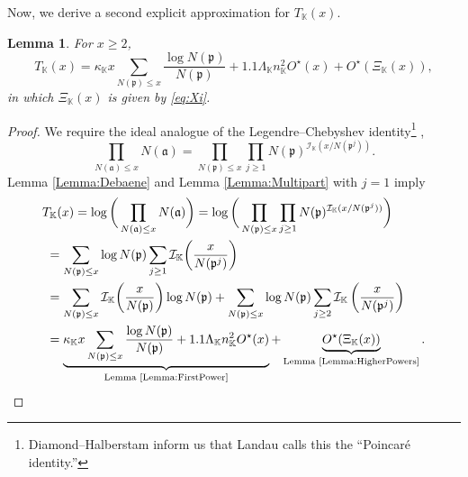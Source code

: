 \documentclass[10pt,reqno]{amsart}
\theoremstyle{plain}
\newtheorem{lemma}[theorem]{Lemma}
\theoremstyle{definition}
\newcommand{\K}{\mathbb{K}}
\newcommand{\PP}{\mathfrak{p}}
\newcommand{\I}{\mathcal{I}}
\begin{document}
Now, we derive a second explicit approximation for $T_{\K}(x)$.

\begin{lemma}\label{Lemma:SecondBound}
For $x \geq 2$,
\begin{equation*}
T_{\K}(x) = \kappa_{\K} x \sum_{N(\PP)\leq x} \frac{\log{N(\PP)}}{N(\PP)} + 1.1 \Lambda_{\K}n_{\K}^2 O^{\star} (x) + O^{\star}(\Xi_{\K}(x)),
\end{equation*}
in which $\Xi_{\K}(x)$ is given by \eqref{eq:Xi}.
\end{lemma}

\begin{proof}
We require the ideal analogue of the Legendre--Chebyshev identity\footnote{Diamond--Halberstam \cite[p.~128]{DiamondHalberstam}
inform us that Landau calls this the ``Poincar\'e identity.''} \cite{Legendre},
\begin{equation*}
\prod_{N(\mathfrak{a})\leq x}N(\mathfrak{a}) = \prod_{N(\PP)\leq x}
\prod_{j\geq 1}N(\PP)^{\I_{\K} ( x / N(\PP^j) )}.
\end{equation*}
Lemma \ref{Lemma:Debaene} and Lemma \ref{Lemma:Multipart} with $j  = 1$ imply
\begin{align*}
&T_{\K}(x)
= \log\bigg(\prod_{N(\mathfrak{a})\leq x}N(\mathfrak{a})\bigg) 
= \log\bigg(\prod_{N(\PP)\leq x} \prod_{j\geq 1}N(\PP)^{\I_{\K} ( x / N(\PP^j) )} \bigg) \\
&\,\,=\sum_{N(\PP)\leq x} \log{N(\PP)} \sum_{j\geq 1} \I_{\K} \bigg(\frac{x}{N(\PP^j)}\bigg)\\
&\,\,=\sum_{N(\PP)\leq x} \I_{\K} \bigg(\frac{x}{N(\PP)}\bigg) \log{N(\PP)}  +\sum_{N(\PP)\leq x} \log{N(\PP)} \sum_{j\geq 2} \I_{\K} \left(\frac{x}{N(\PP^j)}\right)  \\
&\,\,= \underbrace{\kappa_{\K} x \sum_{N(\PP)\leq x} \frac{\log{N(\PP)}}{N(\PP)} + 1.1 \Lambda_{\K}n_{\K}^2 O^{\star} (x) }_{\text{Lemma \ref{Lemma:FirstPower}}}+
\underbrace{O^{\star}(\Xi_{\K}(x))}_{\text{Lemma \ref{Lemma:HigherPowers}}} . \qedhere
\end{align*}
\end{proof}
\end{document}
